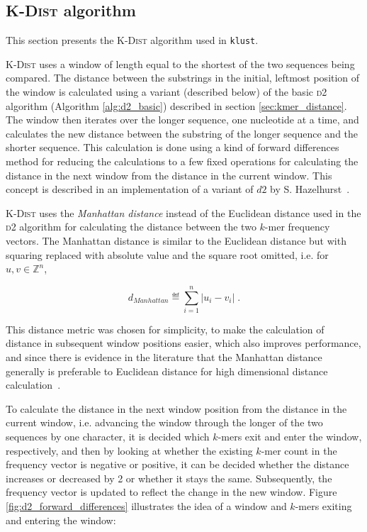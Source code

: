 \subsection{\textsc{K-Dist} algorithm}

This section presents the \textsc{K-Dist} algorithm used in \texttt{klust}.

\textsc{K-Dist} uses a window of length equal to the shortest of the two
sequences being compared. The distance between the substrings in the initial,
leftmost position of the window is calculated using a variant (described
below) of the basic \textsc{d2} algorithm (Algorithm \ref{alg:d2_basic})
described in section \ref{sec:kmer_distance}. The window then iterates over
the longer sequence, one nucleotide at a time, and calculates the new distance
between the substring of the longer sequence and the shorter sequence.  This
calculation is done using a kind of forward differences method for reducing
the calculations to a few fixed operations for calculating the distance in the
next window from the distance in the current window. This concept is described
in an implementation of a variant of $d2$ by S. Hazelhurst~\cite{hazelhurst}.

\textsc{K-Dist} uses the \emph{Manhattan distance} instead of the Euclidean
distance used in the \textsc{d2} algorithm for calculating the distance between
the two $k$-mer frequency vectors. The Manhattan distance is similar to the
Euclidean distance but with squaring replaced with absolute value and the
square root omitted, i.e.  for $u, v \in \mathbb{Z}^n$,

\begin{equation}
  d_{Manhattan} \eqdef \sum_{i=1}^{n} |u_i - v_i| \;.
\end{equation}

This distance metric was chosen for simplicity, to make the calculation of
distance in subsequent window positions easier, which also improves
performance, and since there is evidence in the literature that the Manhattan
distance generally is preferable to Euclidean distance for high dimensional
distance calculation~\cite{aggarwal}. 

To calculate the distance in the next window position from the distance in the
current window, i.e. advancing the window through the longer of the two
sequences by one character, it is decided which $k$-mers exit and enter the
window, respectively, and then by looking at whether the existing $k$-mer count
in the frequency vector is negative or positive, it can be decided whether the
distance increases or decreased by 2 or whether it stays the same.
Subsequently, the frequency vector is updated to reflect the change in the new
window. Figure \ref{fig:d2_forward_differences} illustrates the idea of a
window and $k$-mers exiting and entering the window:

